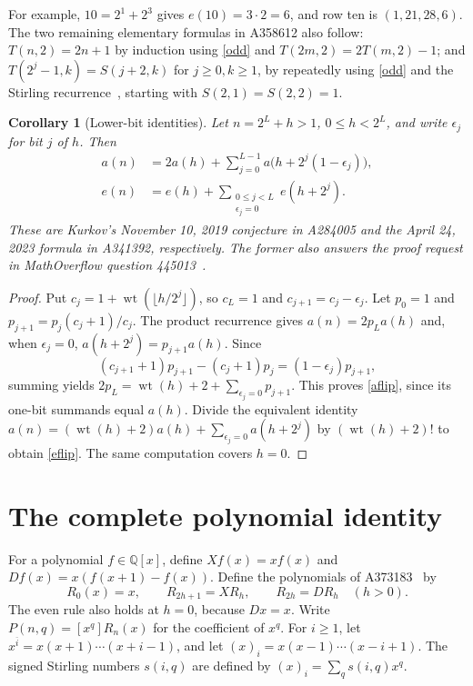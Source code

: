 \documentclass[11pt]{article}
\newcommand{\wt}{\operatorname{wt}}
\newtheorem{corollary}[theorem]{Corollary}
\begin{document}
For example, $10=2^1+2^3$ gives $e(10)=3\cdot2=6$, and row ten is
$(1,21,28,6)$. The two remaining elementary formulas in A358612 also
follow: $T(n,2)=2n+1$ by induction using \eqref{odd} and
$T(2m,2)=2T(m,2)-1$; and
$T(2^j-1,k)=S(j+2,k)$ for $j\geq0,k\geq1$, by repeatedly using
\eqref{odd} and the Stirling recurrence~\cite[Eq.~26.8.22]{dlmf},
starting with $S(2,1)=S(2,2)=1$.

\begin{corollary}[Lower-bit identities]\label{bitflip}
Let $n=2^L+h>1$, $0\leq h<2^L$, and write $\epsilon_j$ for bit $j$
of $h$. Then
\begin{align}
 a(n)&=2a(h)+\sum_{j=0}^{L-1}a\bigl(h+2^j(1-\epsilon_j)\bigr),\label{aflip}\\
 e(n)&=e(h)+\sum_{\substack{0\leq j<L\\\epsilon_j=0}}e(h+2^j).
 \label{eflip}
\end{align}
These are Kurkov's November 10, 2019 conjecture in A284005 and the
April 24, 2023 formula in A341392, respectively. The former also answers
the proof request in MathOverflow question 445013~\cite{lowerquestion}.
\end{corollary}
\begin{proof}
Put $c_j=1+\wt(\lfloor h/2^j\rfloor)$, so $c_L=1$ and
$c_{j+1}=c_j-\epsilon_j$. Let $p_0=1$ and
$p_{j+1}=p_j(c_j+1)/c_j$. The product recurrence gives
$a(n)=2p_La(h)$ and, when $\epsilon_j=0$,
$a(h+2^j)=p_{j+1}a(h)$. Since
\[
 (c_{j+1}+1)p_{j+1}-(c_j+1)p_j=(1-\epsilon_j)p_{j+1},
\]
summing yields $2p_L=\wt(h)+2+\sum_{\epsilon_j=0}p_{j+1}$.
This proves \eqref{aflip}, since its one-bit summands equal $a(h)$.
Divide the equivalent identity
$a(n)=(\wt(h)+2)a(h)+\sum_{\epsilon_j=0}a(h+2^j)$ by
$(\wt(h)+2)!$ to obtain \eqref{eflip}. The same computation covers $h=0$.
\end{proof}

\section{The complete polynomial identity}
For a polynomial $f\in\mathbb Q[x]$, define
$Xf(x)=xf(x)$ and $Df(x)=x(f(x+1)-f(x))$. Define the polynomials
of A373183~\cite{poly} by
\[
 R_0(x)=x,\qquad R_{2h+1}=XR_h,\qquad R_{2h}=DR_h\quad(h>0).
\]
The even rule also holds at $h=0$, because $Dx=x$.
Write $P(n,q)=[x^q]R_n(x)$ for the coefficient of $x^q$.
For $i\geq1$, let $x^{\overline i}=x(x+1)\cdots(x+i-1)$,
and let $(x)_i=x(x-1)\cdots(x-i+1)$.
The signed Stirling numbers $s(i,q)$ are defined by
$(x)_i=\sum_q s(i,q)x^q$.
\end{document}
